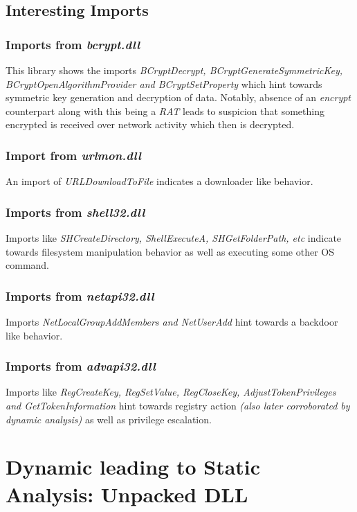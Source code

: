 \documentclass[10pt,a4paper]{article}
\begin{document}
\subsection{Interesting Imports}
	\subsubsection{Imports from \textit{bcrypt.dll}}
	This library shows the imports \textit{BCryptDecrypt, BCryptGenerateSymmetricKey, BCryptOpenAlgorithmProvider and BCryptSetProperty} which hint towards symmetric key generation and decryption of data. Notably, absence of an \textit{encrypt} counterpart along with this being a \textit{RAT} leads to suspicion that something encrypted is received over network activity which then is decrypted.

	\subsubsection{Import from \textit{urlmon.dll}}
	An import of \textit{URLDownloadToFile} indicates a downloader like behavior.

	\subsubsection{Imports from \textit{shell32.dll}}
	Imports like \textit{SHCreateDirectory, ShellExecuteA, SHGetFolderPath, etc} indicate towards filesystem manipulation behavior as well as executing some other OS command.

	\subsubsection{Imports from \textit{netapi32.dll}}
	Imports \textit{NetLocalGroupAddMembers and NetUserAdd} hint towards a backdoor like behavior.

	\subsubsection{Imports from \textit{advapi32.dll}}
	Imports like \textit{RegCreateKey, RegSetValue, RegCloseKey, AdjustTokenPrivileges and GetTokenInformation} hint towards registry action \textit{(also later corroborated by dynamic analysis)} as well as privilege escalation.

\section{Dynamic leading to Static Analysis: Unpacked DLL}
\end{document}
